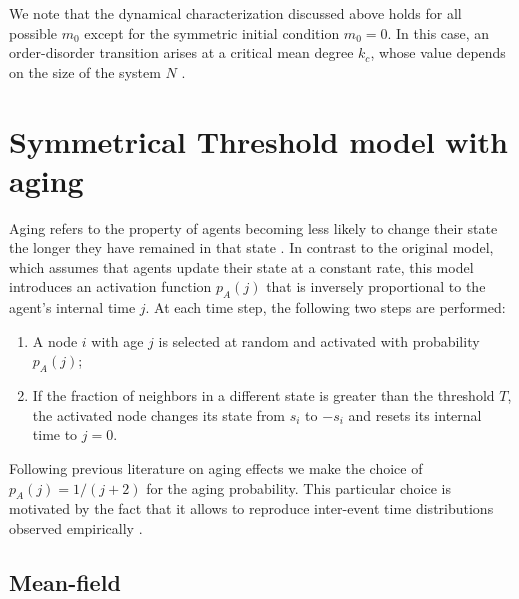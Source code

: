 	We note that the dynamical characterization discussed above holds for all possible $m_0$ except for the symmetric initial condition $m_0 = 0$. In this case, an order-disorder transition arises at a critical mean degree $k_c$, whose value depends on the size of the system $N$ \cite{Konstantin}. 
	
	\section{\label{Symmetrical Threshold model with aging} Symmetrical Threshold model with aging}
	
	Aging refers to the property of agents becoming less likely to change their state the longer they have remained in that state \cite{stark-2008,artime-2017,artime-2018,peralta-2020A,peralta-2020C,chen-2020,Abella-2022,Abella-2022-AME}. In contrast to the original model, which assumes that agents update their state at a constant rate, this model introduces an activation function $p_A (j)$ that is inversely proportional to the agent's internal time $j$. At each time step, the following two steps are performed:
	\begin{enumerate}
		\item A node $i$ with age $j$ is selected at random and activated with probability $p_A(j)$;
		\item If the fraction of neighbors in a different state is greater than the threshold $T$, the activated node changes its state from $s_i$ to $-s_i$ and resets its internal time to $j=0$.
	\end{enumerate}
	Following previous literature on aging effects \cite{fernandez-gracia-2011,peralta-2018,artime-2018,Abella-2022,Abella-2022-AME} we make the choice of $p_A(j) = 1/(j+2)$ for the aging probability. This particular choice is motivated by the fact that it allows to reproduce inter-event time distributions observed empirically \cite{rybski-2009,artime-2017}. 
	\subsection{Mean-field}
	
